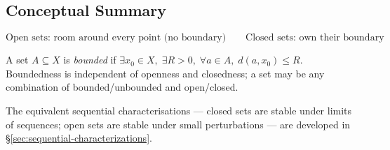 \subsection{Conceptual Summary}
\label{sec:open-closed-summary}

\begin{center}
\[
  \boxed{\text{Open sets: room around every point (no boundary)}}
  \qquad
  \boxed{\text{Closed sets: own their boundary}}
\]
\end{center}

\begin{remark*}
\label{rem:bounded-set}
A set $A \subseteq X$ is \emph{bounded} if
$\exists x_0 \in X,\; \exists R > 0,\; \forall a \in A,\; d(a, x_0) \le R$.
Boundedness is independent of openness and closedness; a set may be any
combination of bounded/unbounded and open/closed.
\end{remark*}

\begin{remark*}
The equivalent sequential characterisations --- closed sets are stable
under limits of sequences; open sets are stable under small perturbations
--- are developed in
\hyperref[sec:sequential-characterizations]{\S\ref*{sec:sequential-characterizations}}.
\end{remark*}